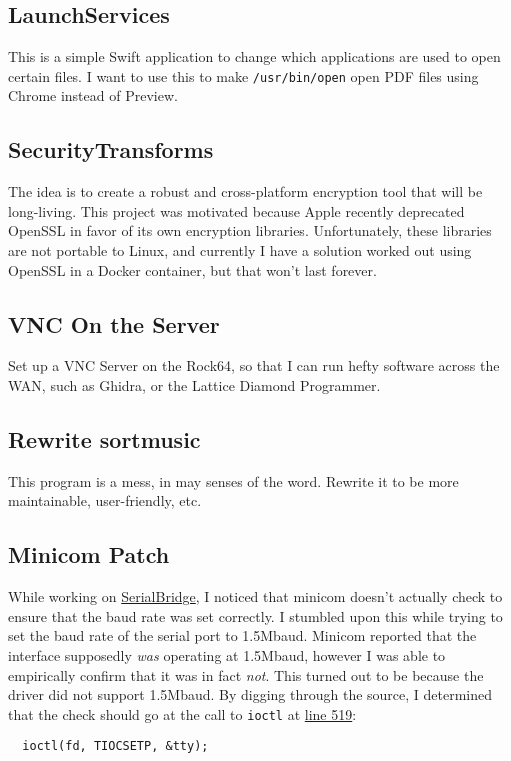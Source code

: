 \documentclass[format.tex]{subfiles}
\begin{document}
\subsection*{LaunchServices}
This is a simple Swift application to change which applications are used to
open certain files. I want to use this to make \texttt{/usr/bin/open} open
PDF files using Chrome instead of Preview.

\subsection*{SecurityTransforms}
The idea is to create a robust and cross-platform encryption tool that will be
long-living. This project was motivated because Apple recently deprecated
OpenSSL in favor of its own encryption libraries. Unfortunately, these
libraries are not portable to Linux, and currently I have a solution worked out
using OpenSSL in a Docker container, but that won't last forever.

\subsection*{VNC On the Server}
Set up a VNC Server on the Rock64, so that I can run hefty software across the
WAN, such as Ghidra, or the Lattice Diamond Programmer.

\subsection*{Rewrite sortmusic}
This program is a mess, in may senses of the word. Rewrite it to be more
maintainable, user-friendly, etc.

\subsection*{Minicom Patch}
While working on
\href{https://github.com/AmateurECE/SerialBridge}{SerialBridge}, I noticed that
minicom doesn't actually check to ensure that the baud rate was set correctly.
I stumbled upon this while trying to set the baud rate of the serial port to
1.5Mbaud. Minicom reported that the interface supposedly \textit{was} operating
at 1.5Mbaud, however I was able to empirically confirm that it was in fact
\textit{not}. This turned out to be because the driver did not support
1.5Mbaud. By digging through the source, I determined that the check should go
at the call to \texttt{ioctl} at
\href{https://github.com/Distrotech/minicom/blob/54202fe0ea8510dc8fcd23ab49d39%
  d3d8cb2e529/src/sysdep1.c#L519}{line 519}:
\begin{verbatim}
  ioctl(fd, TIOCSETP, &tty);
\end{verbatim}
\end{document}
